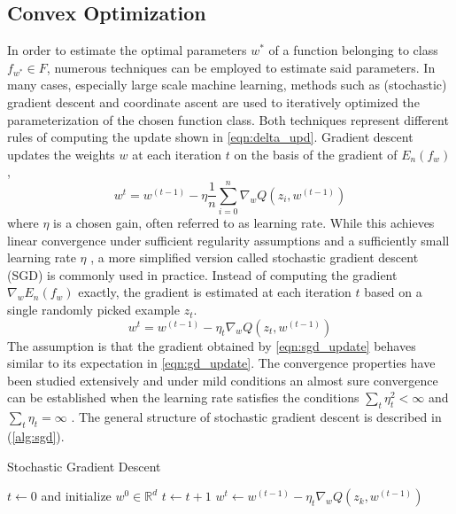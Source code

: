 \subsection{Convex Optimization}
\label{ss:optimization}
In order to estimate the optimal parameters $w^*$ of a function belonging to class $f_{w^*} \in F$, numerous techniques can be employed to estimate said parameters.
In many cases, especially large scale machine learning, methods such as (stochastic) gradient descent and coordinate ascent are used to iteratively optimized the parameterization of the chosen function class.
Both techniques represent different rules of computing the update shown in \ref{eqn:delta_upd}.
Gradient descent updates the weights $w$ at each iteration $t$ on the basis of the gradient of $E_n(f_w)$,
\begin{equation}
w^{t} = w^{(t-1)} - \eta\frac{1}{n}\sum_{i=0}^{n}\nabla_wQ(z_i,w^{(t-1)})
\label{eqn:gd_update}
\end{equation}
where $\eta$ is a chosen gain, often referred to as learning rate.
While this achieves linear convergence under sufficient regularity assumptions and a sufficiently small learning rate $\eta$ \cite{dennis1996numerical} \cite{bottou2010large}, a more simplified version called stochastic gradient descent (SGD) is commonly used in practice.
Instead of computing the gradient $\nabla_wE_n(f_w)$ exactly, the gradient is estimated at each iteration $t$ based on a single randomly picked example $z_t$.
\begin{equation}
w^{t} = w^{(t-1)} - \eta_t\nabla_wQ(z_t,w^{(t-1)})
\label{eqn:sgd_update}
\end{equation}
The assumption is that the gradient obtained by \ref{eqn:sgd_update} behaves similar to its expectation in \ref{eqn:gd_update}.
The convergence properties have been studied extensively and under mild conditions an almost sure convergence can be established when the learning rate satisfies the conditions $\sum_t\eta_t^2 < \infty$ and $\sum_t\eta_t = \infty$ \cite{bottou2010large}.
The general structure of stochastic gradient descent is described in (\ref{alg:sgd}).
\begin{algorithm}
\caption{Stochastic Gradient Descent}\label{alg:sgd}
\begin{algorithmic}[1]
\State $t\gets 0$ and initialize $w^0 \in \mathbb{R}^d$
\Repeat
\State $t \gets t + 1$
\State $w^{t} \gets w^{(t-1)} - \eta_t\nabla_wQ(z_k,w^{(t-1)})$
\EndFor
{}
\end{algorithmic}
\end{algorithm}
